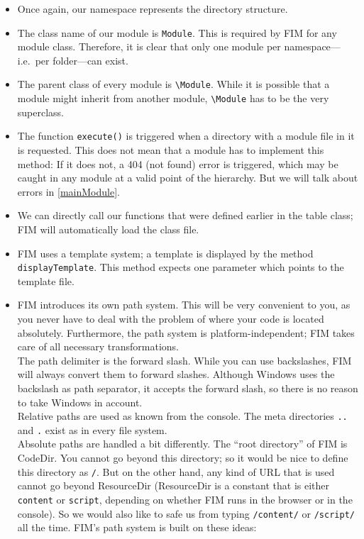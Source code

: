 \documentclass{scrartcl}
\begin{document}
      \begin{itemize}
         \item
            Once again, our namespace represents the directory structure.
         \item
            The class name of our module is \lstinline!Module!. This is required by FIM for any module class. Therefore, it is clear that only one module per namespace---i.e.\ per folder---can exist.
         \item
            The parent class of every module is \lstinline!\Module!. While it is possible that a module might inherit from another module, \lstinline!\Module! has to be the very superclass.
         \item
            The function \lstinline!execute()! is triggered when a directory with a module file in it is requested. This does not mean that a module has to implement this method: If it does not, a 404 (not found) error is triggered, which may be caught in any module at a valid point of the hierarchy. But we will talk about errors in \autoref{mainModule}.
         \item
            We can directly call our functions that were defined earlier in the table class; FIM will automatically load the class file.
         \item
            FIM uses a template system; a template is displayed by the method \lstinline!displayTemplate!. This method expects one parameter which points to the template file.
         \item
            FIM introduces its own path system. This will be very convenient to you, as you never have to deal with the problem of where your code is located absolutely. Furthermore, the path system is platform-independent; FIM takes care of all necessary transformations. \\
            The path delimiter is the forward slash. While you can use backslashes, FIM will always convert them to forward slashes. Although Windows uses the backslash as path separator, it accepts the forward slash, so there is no reason to take Windows in account. \\
            Relative paths are used as known from the console. The meta directories  \texttt{..} and \texttt{.} exist as in every file system. \\
            Absolute paths are handled a bit differently. The ``root directory'' of FIM is CodeDir. You cannot go beyond this directory; so it would be nice to define this directory as \texttt{/}. But on the other hand, any kind of URL that is used cannot go beyond ResourceDir (ResourceDir is a constant that is either \texttt{content} or \texttt{script}, depending on whether FIM runs in the browser or in the console). So we would also like to safe us from typing \texttt{/content/} or \texttt{/script/} all the time. FIM's path system is built on these ideas: \\

\end{itemize}
\end{document}
